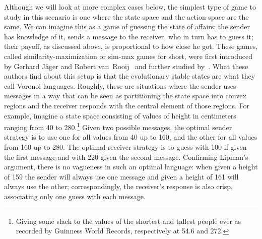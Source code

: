 \documentclass[a4paper]{article}
\begin{document}
Although we will look at more complex cases below, the simplest type of game to study in this scenario is one where the state space and the action space are the same. 
We can imagine this as a game of guessing the state of affairs: the sender has knowledge of it, sends a message to the receiver, who in turn has to guess it; their payoff, as discussed above, is proportional to how close he got. 
These games, called similarity-maximization or sim-max games for short, were first introduced by Gerhard J{\"a}ger and Robert van~Rooij~\parencite{jager_language_2007,Jager2007} and further studied by~\textcite{jager_voronoi_2011}.
What these authors find about this setup is that the evolutionary stable states are what they call Voronoi languages.
Roughly, these are situations where the sender uses messages in a way that can be seen as partitioning the state space into convex regions and the receiver responds with the central element of those regions.
For example, imagine a state space consisting of values of height in centimeters ranging from 40 to 280.\footnote{Giving some slack to the values of the shortest and tallest people ever as recorded by Guinness World Records, respectively at 54.6 and 272.}
Given two possible messages, the optimal sender strategy is to use one for all values from 40 up to 160, and the other for all values from 160 up to 280.
The optimal receiver strategy is to guess with 100 if given the first message and with 220 given the second message.
Confirming Lipman's argument, there is no vagueness in such an optimal language: when given a height of 159 the sender will always use one message and given a height of 161 will always use the other; correspondingly, the receiver's response is also crisp, associating only one guess with each message.
\end{document}

